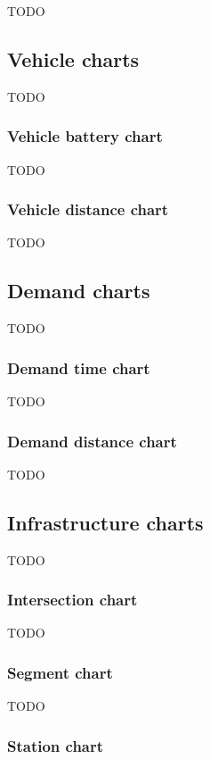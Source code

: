 \documentclass[11pt,twocolumn]{article}
\begin{document}
TODO

\subsection{Vehicle charts}

TODO

\subsubsection{Vehicle battery chart}

TODO

\subsubsection{Vehicle distance chart}

TODO

\subsection{Demand charts}

TODO

\subsubsection{Demand time chart}

TODO

\subsubsection{Demand distance chart}

TODO

\subsection{Infrastructure charts}

TODO

\subsubsection{Intersection chart}

TODO

\subsubsection{Segment chart}

TODO

\subsubsection{Station chart}
\end{document}
